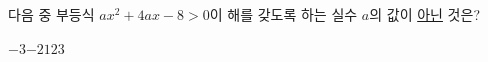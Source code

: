 다음 중 부등식 $ax^2+4ax-8>0$이 해를 갖도록 하는 실수 $a$의 값이 \underline{아닌} 것은?
\begin{choices32}{$-3$}{$-2$}{$1$}{$2$}{$3$}\end{choices32}
